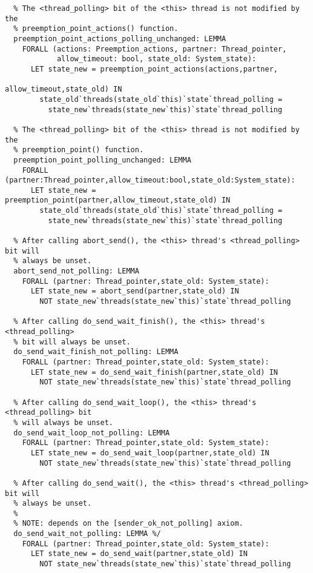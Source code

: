 \begin{lstlisting}
  % The <thread_polling> bit of the <this> thread is not modified by the
  % preemption_point_actions() function.
  preemption_point_actions_polling_unchanged: LEMMA
    FORALL (actions: Preemption_actions, partner: Thread_pointer,
            allow_timeout: bool, state_old: System_state):
      LET state_new = preemption_point_actions(actions,partner,
                                               allow_timeout,state_old) IN
        state_old`threads(state_old`this)`state`thread_polling =
          state_new`threads(state_new`this)`state`thread_polling

  % The <thread_polling> bit of the <this> thread is not modified by the
  % preemption_point() function.
  preemption_point_polling_unchanged: LEMMA
    FORALL (partner:Thread_pointer,allow_timeout:bool,state_old:System_state):
      LET state_new = preemption_point(partner,allow_timeout,state_old) IN
        state_old`threads(state_old`this)`state`thread_polling =
          state_new`threads(state_new`this)`state`thread_polling

  % After calling abort_send(), the <this> thread's <thread_polling> bit will
  % always be unset.
  abort_send_not_polling: LEMMA
    FORALL (partner: Thread_pointer,state_old: System_state):
      LET state_new = abort_send(partner,state_old) IN
        NOT state_new`threads(state_new`this)`state`thread_polling

  % After calling do_send_wait_finish(), the <this> thread's <thread_polling> 
  % bit will always be unset.
  do_send_wait_finish_not_polling: LEMMA
    FORALL (partner: Thread_pointer,state_old: System_state):
      LET state_new = do_send_wait_finish(partner,state_old) IN
        NOT state_new`threads(state_new`this)`state`thread_polling 

  % After calling do_send_wait_loop(), the <this> thread's <thread_polling> bit
  % will always be unset.
  do_send_wait_loop_not_polling: LEMMA
    FORALL (partner: Thread_pointer,state_old: System_state):
      LET state_new = do_send_wait_loop(partner,state_old) IN
        NOT state_new`threads(state_new`this)`state`thread_polling 

  % After calling do_send_wait(), the <this> thread's <thread_polling> bit will
  % always be unset.
  %
  % NOTE: depends on the [sender_ok_not_polling] axiom.
  do_send_wait_not_polling: LEMMA %/
    FORALL (partner: Thread_pointer,state_old: System_state):
      LET state_new = do_send_wait(partner,state_old) IN
        NOT state_new`threads(state_new`this)`state`thread_polling 


\end{lstlisting}
